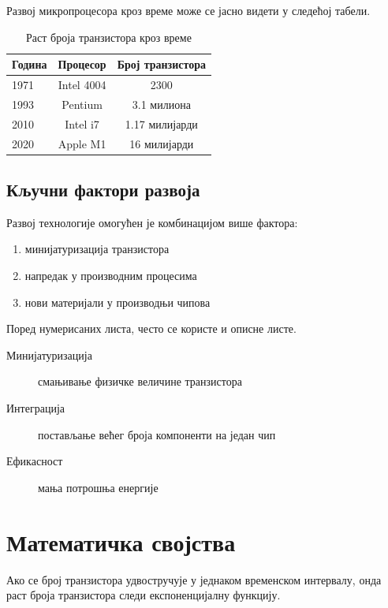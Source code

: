 \documentclass{article}
\begin{document}
Развој микропроцесора кроз време може се јасно видети у следећој табели.


\begin{table}[!ht]
\centering
\caption{Раст броја транзистора кроз време}
\label{tab:rast}
\renewcommand{\arraystretch}{0.9}
\begin{tabularx}{\textwidth}{|X|c|c|}
\hline
\textbf{Година} & \textbf{Процесор} & \textbf{Број транзистора} \\
\hline
1971   & Intel 4004 & 2300 \\
1993   & Pentium & 3.1 милиона \\
2010   & Intel i7 & 1.17 милијарди \\
2020  & Apple M1 & 16 милијарди \\
\hline
\end{tabularx}
\end{table}

\subsection{Кључни фактори развоја}

Развој технологије омогућен је комбинацијом више фактора:

\begin{enumerate}
\item минијатуризација транзистора
\item напредак у производним процесима
\item нови материјали у производњи чипова
\end{enumerate}

Поред нумерисаних листа, често се користе и описне листе.

\begin{description}
\item[Минијатуризација] смањивање физичке величине транзистора
\item[Интеграција] постављање већег броја компоненти на један чип
\item[Ефикасност] мања потрошња енергије
\end{description}

\section{Математичка својства}


Ако се број транзистора удвостручује у једнаком временском интервалу, онда раст броја 
транзистора следи експоненцијалну функцију.
\end{document}
